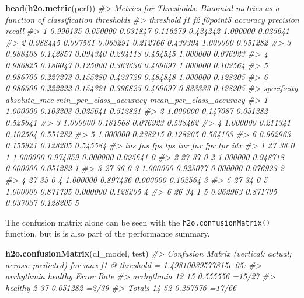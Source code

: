 \documentclass[]{book}
\newenvironment{Shaded}{\begin{snugshade}}{\end{snugshade}}
\newcommand{\CommentTok}[1]{\textcolor[rgb]{0.56,0.35,0.01}{\textit{#1}}}
\newcommand{\KeywordTok}[1]{\textcolor[rgb]{0.13,0.29,0.53}{\textbf{#1}}}
\newcommand{\NormalTok}[1]{#1}
\begin{document}
\begin{Shaded}
\begin{Highlighting}[]
\KeywordTok{head}\NormalTok{(}\KeywordTok{h2o.metric}\NormalTok{(perf))}
\CommentTok{#> Metrics for Thresholds: Binomial metrics as a function of classification thresholds}
\CommentTok{#>   threshold       f1       f2 f0point5 accuracy precision   recall}
\CommentTok{#> 1  0.990135 0.050000 0.031847 0.116279 0.424242  1.000000 0.025641}
\CommentTok{#> 2  0.988445 0.097561 0.063291 0.212766 0.439394  1.000000 0.051282}
\CommentTok{#> 3  0.988408 0.142857 0.094340 0.294118 0.454545  1.000000 0.076923}
\CommentTok{#> 4  0.986825 0.186047 0.125000 0.363636 0.469697  1.000000 0.102564}
\CommentTok{#> 5  0.986705 0.227273 0.155280 0.423729 0.484848  1.000000 0.128205}
\CommentTok{#> 6  0.986509 0.222222 0.154321 0.396825 0.469697  0.833333 0.128205}
\CommentTok{#>   specificity absolute_mcc min_per_class_accuracy mean_per_class_accuracy}
\CommentTok{#> 1    1.000000     0.103203               0.025641                0.512821}
\CommentTok{#> 2    1.000000     0.147087               0.051282                0.525641}
\CommentTok{#> 3    1.000000     0.181568               0.076923                0.538462}
\CommentTok{#> 4    1.000000     0.211341               0.102564                0.551282}
\CommentTok{#> 5    1.000000     0.238215               0.128205                0.564103}
\CommentTok{#> 6    0.962963     0.155921               0.128205                0.545584}
\CommentTok{#>   tns fns fps tps      tnr      fnr      fpr      tpr idx}
\CommentTok{#> 1  27  38   0   1 1.000000 0.974359 0.000000 0.025641   0}
\CommentTok{#> 2  27  37   0   2 1.000000 0.948718 0.000000 0.051282   1}
\CommentTok{#> 3  27  36   0   3 1.000000 0.923077 0.000000 0.076923   2}
\CommentTok{#> 4  27  35   0   4 1.000000 0.897436 0.000000 0.102564   3}
\CommentTok{#> 5  27  34   0   5 1.000000 0.871795 0.000000 0.128205   4}
\CommentTok{#> 6  26  34   1   5 0.962963 0.871795 0.037037 0.128205   5}
\end{Highlighting}
\end{Shaded}

The confusion matrix alone can be seen with the \texttt{h2o.confusionMatrix()} function, but is is also part of the performance summary.

\begin{Shaded}
\begin{Highlighting}[]
\KeywordTok{h2o.confusionMatrix}\NormalTok{(dl_model, test)}
\CommentTok{#> Confusion Matrix (vertical: actual; across: predicted)  for max f1 @ threshold = 1.49810039577815e-05:}
\CommentTok{#>            arrhythmia healthy    Error    Rate}
\CommentTok{#> arrhythmia         12      15 0.555556  =15/27}
\CommentTok{#> healthy             2      37 0.051282   =2/39}
\CommentTok{#> Totals             14      52 0.257576  =17/66}
\end{Highlighting}
\end{Shaded}
\end{document}
